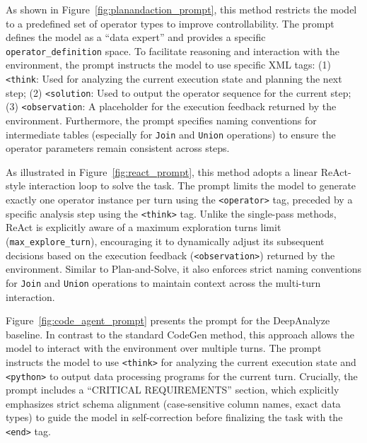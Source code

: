 As shown in Figure~\ref{fig:planandaction_prompt}, this method restricts the model to a predefined set of operator types to improve controllability.
The prompt defines the model as a ``data expert'' and provides a specific \texttt{operator\_definition} space.
To facilitate reasoning and interaction with the environment, the prompt instructs the model to use specific XML tags:
(1) \texttt{<think}: Used for analyzing the current execution state and planning the next step;
(2) \texttt{<solution}: Used to output the operator sequence for the current step;
(3) \texttt{<observation}: A placeholder for the execution feedback returned by the environment.
Furthermore, the prompt specifies naming conventions for intermediate tables (especially for \texttt{Join} and \texttt{Union} operations) to ensure the operator parameters remain consistent across steps.

As illustrated in Figure~\ref{fig:react_prompt}, this method adopts a linear ReAct-style interaction loop to solve the task.
The prompt limits the model to generate exactly one operator instance per turn using the \texttt{<operator>} tag, preceded by a specific analysis step using the \texttt{<think>} tag.
Unlike the single-pass methods, ReAct is explicitly aware of a maximum exploration turns limit (\texttt{max\_explore\_turn}), encouraging it to dynamically adjust its subsequent decisions based on the execution feedback (\texttt{<observation>}) returned by the environment.
Similar to Plan-and-Solve, it also enforces strict naming conventions for \texttt{Join} and \texttt{Union} operations to maintain context across the multi-turn interaction.

Figure~\ref{fig:code_agent_prompt} presents the prompt for the DeepAnalyze baseline.
In contrast to the standard CodeGen method, this approach allows the model to interact with the environment over multiple turns.
The prompt instructs the model to use \texttt{<think>} for analyzing the current execution state and \texttt{<python>} to output data processing programs for the current turn.
Crucially, the prompt includes a ``CRITICAL REQUIREMENTS'' section, which explicitly emphasizes strict schema alignment (\eg case-sensitive column names, exact data types) to guide the model in self-correction before finalizing the task with the \texttt{<end>} tag.

